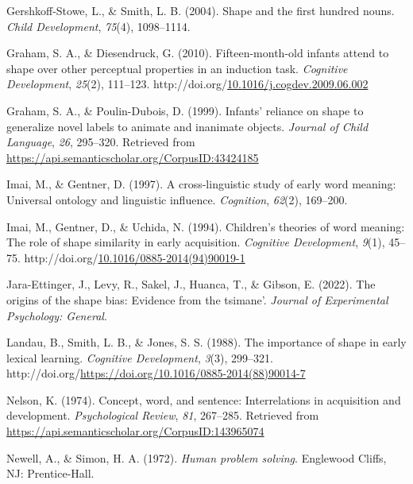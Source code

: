 \documentclass[10pt, letterpaper]{article}
\newenvironment{CSLReferences}%
  {}%
  {\par}
\begin{document}
\begin{CSLReferences}{1}{0}
\leavevmode{}%
Gershkoff-Stowe, L., \& Smith, L. B. (2004). Shape and the first hundred
nouns. \emph{Child Development}, \emph{75}(4), 1098--1114.

\leavevmode{}%
Graham, S. A., \& Diesendruck, G. (2010). Fifteen-month-old infants
attend to shape over other perceptual properties in an induction task.
\emph{Cognitive Development}, \emph{25}(2), 111--123.
http://doi.org/\href{https://doi.org/10.1016/j.cogdev.2009.06.002}{10.1016/j.cogdev.2009.06.002}

\leavevmode{}%
Graham, S. A., \& Poulin-Dubois, D. (1999). Infants' reliance on shape
to generalize novel labels to animate and inanimate objects.
\emph{Journal of Child Language}, \emph{26}, 295--320. Retrieved from
\url{https://api.semanticscholar.org/CorpusID:43424185}

\leavevmode{}%
Imai, M., \& Gentner, D. (1997). A cross-linguistic study of early word
meaning: Universal ontology and linguistic influence. \emph{Cognition},
\emph{62}(2), 169--200.

\leavevmode{}%
Imai, M., Gentner, D., \& Uchida, N. (1994). Children's theories of word
meaning: {The} role of shape similarity in early acquisition.
\emph{Cognitive Development}, \emph{9}(1), 45--75.
http://doi.org/\href{https://doi.org/10.1016/0885-2014(94)90019-1}{10.1016/0885-2014(94)90019-1}

\leavevmode{}%
Jara-Ettinger, J., Levy, R., Sakel, J., Huanca, T., \& Gibson, E.
(2022). The origins of the shape bias: Evidence from the tsimane'.
\emph{Journal of Experimental Psychology: General}.

\leavevmode{}%
Landau, B., Smith, L. B., \& Jones, S. S. (1988). The importance of
shape in early lexical learning. \emph{Cognitive Development},
\emph{3}(3), 299--321.
http://doi.org/\url{https://doi.org/10.1016/0885-2014(88)90014-7}

\leavevmode{}%
Nelson, K. (1974). Concept, word, and sentence: Interrelations in
acquisition and development. \emph{Psychological Review}, \emph{81},
267--285. Retrieved from
\url{https://api.semanticscholar.org/CorpusID:143965074}

\leavevmode{}%
Newell, A., \& Simon, H. A. (1972). \emph{Human problem solving}.
Englewood Cliffs, NJ: Prentice-Hall.


\end{CSLReferences}
\end{document}
